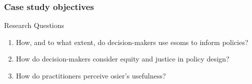 \begin{frame}
    \frametitle{Case study objectives}
    
    \begin{block}{Research Questions}
        \begin{enumerate}[<+->]
            \item How, and to what extent, do decision-makers use \glspl{esom} to inform policies?
            \item How do decision-makers consider equity and justice in policy design?
            \item How do practitioners perceive \gls{osier}'s usefulness?
        \end{enumerate}
    \end{block}
    
\end{frame}
